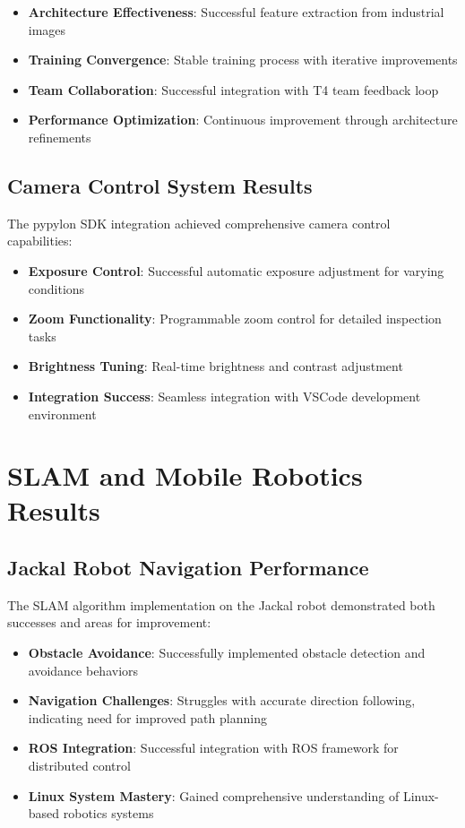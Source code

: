 \documentclass{book}
\begin{document}
\begin{itemize}
\item \textbf{Architecture Effectiveness}: Successful feature extraction from industrial images
\item \textbf{Training Convergence}: Stable training process with iterative improvements
\item \textbf{Team Collaboration}: Successful integration with T4 team feedback loop
\item \textbf{Performance Optimization}: Continuous improvement through architecture refinements
\end{itemize}

\subsection{Camera Control System Results}

\par\noindent The pypylon SDK integration achieved comprehensive camera control capabilities:

\begin{itemize}
\item \textbf{Exposure Control}: Successful automatic exposure adjustment for varying conditions
\item \textbf{Zoom Functionality}: Programmable zoom control for detailed inspection tasks
\item \textbf{Brightness Tuning}: Real-time brightness and contrast adjustment
\item \textbf{Integration Success}: Seamless integration with VSCode development environment
\end{itemize}

\section{SLAM and Mobile Robotics Results}

\subsection{Jackal Robot Navigation Performance}

\par\noindent The SLAM algorithm implementation on the Jackal robot demonstrated both successes and areas for improvement:

\begin{itemize}
\item \textbf{Obstacle Avoidance}: Successfully implemented obstacle detection and avoidance behaviors
\item \textbf{Navigation Challenges}: Struggles with accurate direction following, indicating need for improved path planning
\item \textbf{ROS Integration}: Successful integration with ROS framework for distributed control
\item \textbf{Linux System Mastery}: Gained comprehensive understanding of Linux-based robotics systems
\end{itemize}
\end{document}
